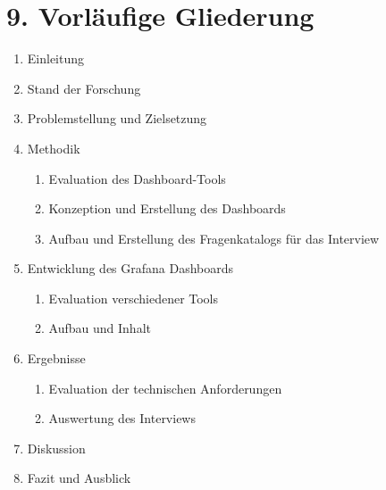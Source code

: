 \section*{9. Vorläufige Gliederung}
\begin{enumerate}
    \item Einleitung
    \item Stand der Forschung
    \item Problemstellung und Zielsetzung
    \item Methodik
    \begin{enumerate}
        \item Evaluation des Dashboard-Tools
        \item Konzeption und Erstellung des Dashboards
        \item Aufbau und Erstellung des Fragenkatalogs für das Interview
    \end{enumerate}
    \item Entwicklung des Grafana Dashboards
    \begin{enumerate}
        \item Evaluation verschiedener Tools
        \item Aufbau und Inhalt
    \end{enumerate}
    \item Ergebnisse
    \begin{enumerate}
        \item Evaluation der technischen Anforderungen
        \item Auswertung des Interviews
    \end{enumerate}
    \item Diskussion
    \item Fazit und Ausblick
\end{enumerate}
